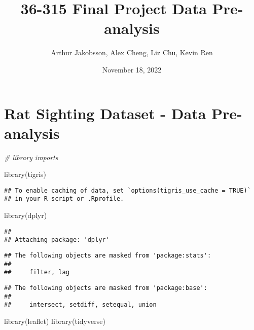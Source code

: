 \documentclass[
]{article}
\title{36-315 Final Project Data Pre-analysis}
\author{Arthur Jakobsson, Alex Cheng, Liz Chu, Kevin Ren}
\date{November 18, 2022}
\newenvironment{Shaded}{\begin{snugshade}}{\end{snugshade}}
\newcommand{\CommentTok}[1]{\textcolor[rgb]{0.56,0.35,0.01}{\textit{#1}}}
\newcommand{\FunctionTok}[1]{\textcolor[rgb]{0.00,0.00,0.00}{#1}}
\newcommand{\NormalTok}[1]{#1}
\begin{document}
\maketitle

{
\hypersetup{linkcolor=}
\setcounter{tocdepth}{2}
\tableofcontents
}
\hypertarget{rat-sighting-dataset---data-pre-analysis}{%
\section{Rat Sighting Dataset - Data
Pre-analysis}\label{rat-sighting-dataset---data-pre-analysis}}

\begin{Shaded}
\begin{Highlighting}[]
\CommentTok{\# library imports}

\FunctionTok{library}\NormalTok{(tigris)}
\end{Highlighting}
\end{Shaded}

\begin{verbatim}
## To enable caching of data, set `options(tigris_use_cache = TRUE)`
## in your R script or .Rprofile.
\end{verbatim}

\begin{Shaded}
\begin{Highlighting}[]
\FunctionTok{library}\NormalTok{(dplyr)}
\end{Highlighting}
\end{Shaded}

\begin{verbatim}
## 
## Attaching package: 'dplyr'
\end{verbatim}

\begin{verbatim}
## The following objects are masked from 'package:stats':
## 
##     filter, lag
\end{verbatim}

\begin{verbatim}
## The following objects are masked from 'package:base':
## 
##     intersect, setdiff, setequal, union
\end{verbatim}

\begin{Shaded}
\begin{Highlighting}[]
\FunctionTok{library}\NormalTok{(leaflet)}
\FunctionTok{library}\NormalTok{(tidyverse)}
\end{Highlighting}
\end{Shaded}
\end{document}
